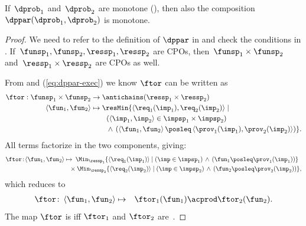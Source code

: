 \begin{proposition}
\label{pro:dppar-monotone}If~$\dprob_{1}$ and~$\dprob_{2}$ are
monotone (), then also the composition~$\dppar(\dprob_{1},\dprob_{2})$
is monotone.
\end{proposition}
\begin{proof}
We need to refer to the definition of $\dppar$ in 
and check the conditions in . If~$\funsp_{1},\funsp_{2},\ressp_{1},\ressp_{2}$
are CPOs, then~$\funsp_{1}\times\funsp_{2}$ and~$\ressp_{1}\times\ressp_{2}$
are CPOs as well.

From  and (\ref{eq:dppar-exec}) we know $\ftor$ can
be written as
\begin{align*}
\ftor:\funsp_{1}\times\funsp_{2} & \rightarrow\antichains(\ressp_{1}\times\ressp_{2})\\
\left\langle \fun_{1},\fun_{2}\right\rangle  & \mapsto\resMin\{\left\langle \req_{1}(\imp_{1}),\req_{2}(\imp_{2})\right\rangle \mid\\
 & \qquad\left(\left\langle \imp_{1},\imp_{2}\right\rangle \in\impsp_{1}\times\impsp_{2}\right)\\
 & \qquad\,\wedge\,\left(\left\langle \fun_{1},\fun_{2}\right\rangle \posleq\left\langle \prov_{1}(\imp_{1}),\prov_{2}(\imp_{2})\right\rangle \right)\}.
\end{align*}
All terms factorize in the two components, giving:{\small{}
\begin{align*}
\ftor\!:\!\left\langle \fun_{1},\fun_{2}\right\rangle \mapsto & \!\!\!\quad\Min_{\ressp_{1}}\{\left\langle \req_{1}(\imp_{1})\right\rangle \mid\left(\imp\in\impsp_{1}\right)\,\wedge\,\left(\fun_{1}\posleq\prov_{1}(\imp_{1})\right)\}\\
 & \!\!\!\times\Min_{\ressp_{2}}\{\left\langle \req_{2}(\imp_{2})\right\rangle \mid\left(\imp\in\impsp_{2}\right)\,\wedge\,\left(\fun_{2}\posleq\prov_{2}(\imp_{2})\right)\},
\end{align*}
}which reduces to
\begin{eqnarray}
\ftor\colon\left\langle \fun_{1},\fun_{2}\right\rangle  & \mapsto & \ftor_{1}(\fun_{1})\acprod\ftor_{2}(\fun_{2}).\label{eq:isproduct}
\end{eqnarray}
The map $\ftor$ is \scottcontinuous iff $\ftor_{1}$ and $\ftor_{2}$
are~\cite[Lemma II.2.8]{gierz03continuous}.
\end{proof}

